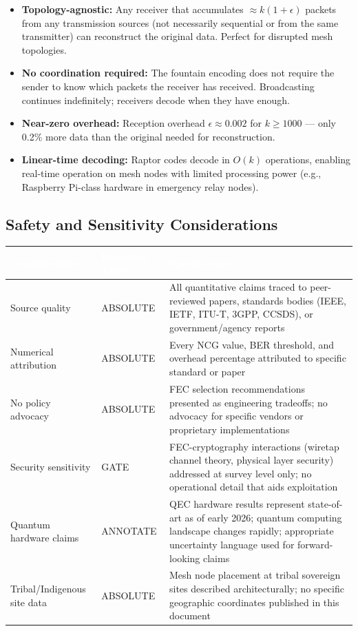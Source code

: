 \documentclass[11pt,letterpaper]{article}
\newcommand{\tableheader}[1]{\textbf{\sffamily\textcolor{white}{#1}}}
\begin{document}
\begin{itemize}[leftmargin=*]
  \item \textbf{Topology-agnostic:} Any receiver that accumulates $\approx k(1+\epsilon)$ packets from any transmission sources (not necessarily sequential or from the same transmitter) can reconstruct the original data. Perfect for disrupted mesh topologies.
  \item \textbf{No coordination required:} The fountain encoding does not require the sender to know which packets the receiver has received. Broadcasting continues indefinitely; receivers decode when they have enough.
  \item \textbf{Near-zero overhead:} Reception overhead $\epsilon \approx 0.002$ for $k \geq 1000$ --- only 0.2\% more data than the original needed for reconstruction.
  \item \textbf{Linear-time decoding:} Raptor codes decode in $O(k)$ operations, enabling real-time operation on mesh nodes with limited processing power (e.g., Raspberry Pi-class hardware in emergency relay nodes).
\end{itemize}

\subsection{Safety and Sensitivity Considerations}

\begin{center}
\begin{tabularx}{\textwidth}{L{3.5cm}L{2.5cm}X}
\toprule
{}
\tableheader{Consideration} & \tableheader{Boundary Type} & \tableheader{Specification} \\
\midrule
Source quality & ABSOLUTE & All quantitative claims traced to peer-reviewed papers, standards bodies (IEEE, IETF, ITU-T, 3GPP, CCSDS), or government/agency reports \\
Numerical attribution & ABSOLUTE & Every NCG value, BER threshold, and overhead percentage attributed to specific standard or paper \\
No policy advocacy & ABSOLUTE & FEC selection recommendations presented as engineering tradeoffs; no advocacy for specific vendors or proprietary implementations \\
Security sensitivity & GATE & FEC-cryptography interactions (wiretap channel theory, physical layer security) addressed at survey level only; no operational detail that aids exploitation \\
Quantum hardware claims & ANNOTATE & QEC hardware results represent state-of-art as of early 2026; quantum computing landscape changes rapidly; appropriate uncertainty language used for forward-looking claims \\
Tribal/Indigenous site data & ABSOLUTE & Mesh node placement at tribal sovereign sites described architecturally; no specific geographic coordinates published in this document \\
\bottomrule
\end{tabularx}
\end{center}
\end{document}
